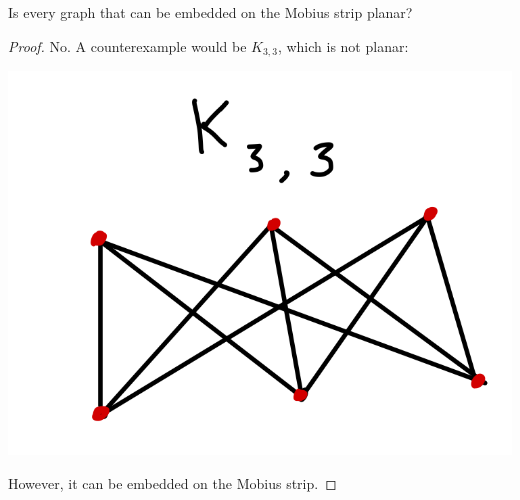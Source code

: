 \documentclass[12pt]{article}
\newenvironment{statement}[2][Statement]{\begin{trivlist}
\item[\hskip \labelsep {\bfseries #1}\hskip \labelsep {\bfseries #2.}]}{\end{trivlist}}
\begin{document}
\begin{statement}[Problem]{5}
  Is every graph that can be embedded on the Mobius strip planar?
\end{statement}
\begin{proof}
  No. A counterexample would be $K_{3,3}$, which is not planar: 
  \par \begin{center} \includegraphics[scale=.2]{5-1.png} \end{center}
  However, it can be embedded on the Mobius strip.
\end{proof}
\end{document}
